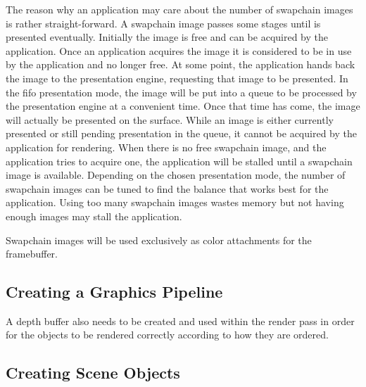       The reason why an application may care about the number of swapchain images is rather straight-forward.
      A swapchain image passes some stages until is presented eventually.
      Initially the image is free and can be acquired by the application.
      Once an application acquires the image it is considered to be in use by the application and no longer free.
      At some point, the application hands back the image to the presentation engine, requesting that image to be presented.
      In the \gls{fifo} presentation mode, the image will be put into a queue to be processed by the presentation engine at a convenient time.
      Once that time has come, the image will actually be presented on the surface.
      While an image is either currently presented or still pending presentation in the queue, it cannot be acquired by the application for rendering.
      When there is no free swapchain image, and the application tries to acquire one, the application will be stalled until a swapchain image is available.
      Depending on the chosen presentation mode, the number of swapchain images can be tuned to find the balance that works best for the application.
      Using too many swapchain images wastes memory but not having enough images may stall the application.

      Swapchain images will be used exclusively as color attachments for the framebuffer.

    \subsection{Creating a Graphics Pipeline}
      A depth buffer also needs to be created and used within the render pass in order for the objects to be rendered correctly according to how they are ordered.

      \tbd

    \subsection{Creating Scene Objects}
      \tbd

